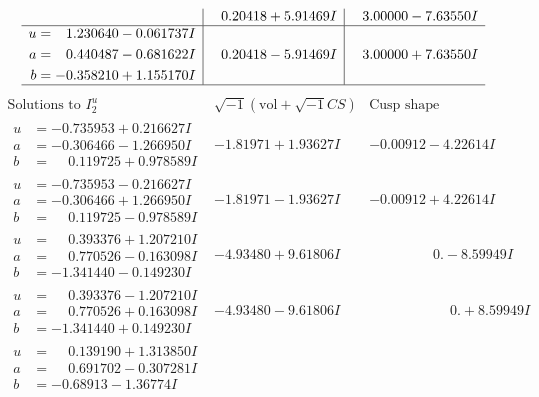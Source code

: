 \documentclass[1p]{elsarticle_modified}
\theoremstyle{definition}
\newcommand{\I}{\sqrt{-1}}
\begin{document}
$$\begin{array}{c|c|c}
 & \phantom{-}0.20418 + 5.91469 I & \phantom{-}3.00000 - 7.63550 I \\ \hline\begin{aligned}
u &= \phantom{-}1.230640 - 0.061737 I \\
a &= \phantom{-}0.440487 - 0.681622 I \\
b &= -0.358210 + 1.155170 I\end{aligned}
 & \phantom{-}0.20418 - 5.91469 I & \phantom{-}3.00000 + 7.63550 I\\
 \hline 
 \end{array}$$\newpage$$\begin{array}{c|c|c}  
\text{Solutions to }I^u_{2}& \I (\text{vol} + \sqrt{-1}CS) & \text{Cusp shape}\\
 \hline 
\begin{aligned}
u &= -0.735953 + 0.216627 I \\
a &= -0.306466 - 1.266950 I \\
b &= \phantom{-}0.119725 + 0.978589 I\end{aligned}
 & -1.81971 + 1.93627 I & -0.00912 - 4.22614 I \\ \hline\begin{aligned}
u &= -0.735953 - 0.216627 I \\
a &= -0.306466 + 1.266950 I \\
b &= \phantom{-}0.119725 - 0.978589 I\end{aligned}
 & -1.81971 - 1.93627 I & -0.00912 + 4.22614 I \\ \hline\begin{aligned}
u &= \phantom{-}0.393376 + 1.207210 I \\
a &= \phantom{-}0.770526 - 0.163098 I \\
b &= -1.341440 - 0.149230 I\end{aligned}
 & -4.93480 + 9.61806 I & \phantom{-0.000000 } 0. - 8.59949 I \\ \hline\begin{aligned}
u &= \phantom{-}0.393376 - 1.207210 I \\
a &= \phantom{-}0.770526 + 0.163098 I \\
b &= -1.341440 + 0.149230 I\end{aligned}
 & -4.93480 - 9.61806 I & \phantom{-0.000000 -}0. + 8.59949 I \\ \hline\begin{aligned}
u &= \phantom{-}0.139190 + 1.313850 I \\
a &= \phantom{-}0.691702 - 0.307281 I \\
b &= -0.68913 - 1.36774 I\end{aligned}

\end{array}$$
\end{document}
